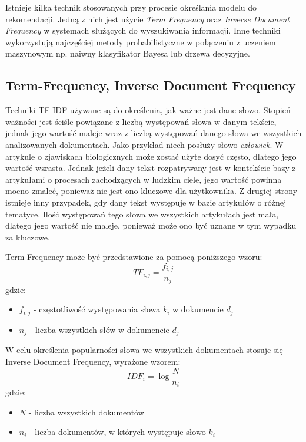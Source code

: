 Istnieje kilka technik stosowanych przy procesie określania modelu do rekomendacji. Jedną z nich jest użycie \textit{Term Frequency} oraz \textit{Inverse Document Frequency} w systemach służących do wyszukiwania informacji. Inne techniki wykorzystują najczęściej metody probabilistyczne w połączeniu z uczeniem maszynowym np. naiwny klasyfikator Bayesa lub drzewa decyzyjne.

\subsection{Term-Frequency, Inverse Document Frequency}
Techniki TF-IDF używane są do określenia, jak ważne jest dane słowo. Stopień ważności jest ściśle powiązane z liczbą występowań słowa w danym tekście, jednak jego wartość maleje wraz z liczbą występowań danego słowa we wszystkich analizowanych dokumentach. Jako przykład niech posłuży słowo \textit{człowiek}. W artykule o zjawiskach biologicznych może zostać użyte dosyć często, dlatego jego wartość wzrasta. Jednak jeżeli dany tekst rozpatrywany jest w kontekście bazy z artykułami o procesach zachodzących w ludzkim ciele, jego wartość powinna mocno zmaleć, ponieważ nie jest ono kluczowe dla użytkownika. Z drugiej strony istnieje inny przypadek, gdy dany tekst występuje w bazie artykułów o różnej tematyce. Ilość występowań tego słowa we wszystkich artykułach jest mała, dlatego jego wartość nie maleje, ponieważ może ono być uznane w tym wypadku za kluczowe.

Term-Frequency może być przedstawione za pomocą poniższego wzoru:
\begin{equation}
 TF_{i,j} = \frac{f_{i,j}}{n_j}
\end{equation}
gdzie:
\begin{itemize}
	\item[] $f_{i,j}$ - częstotliwość występowania słowa $k_i$ w dokumencie $d_j$
	\item[] $n_j$ - liczba wszystkich słów w dokumencie $d_j$
\end{itemize}

W celu określenia popularności słowa we wszystkich dokumentach stosuje się Inverse Document Frequency, wyrażone wzorem:
\begin{equation}
IDF_i = \log{\frac{N}{n_i}}
\end{equation}
gdzie:
\begin{itemize}
	\item[] $N$ - liczba wszystkich dokumentów
	\item[] $n_i$ - liczba dokumentów, w których występuje słowo $k_i$
\end{itemize}


